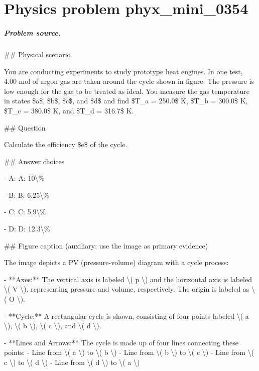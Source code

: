 
\chapter{Physics problem phyx\_mini\_0354}
\label{ch:PhyXMiniProblems_problem_phyx_mini_0354}

\paragraph{Problem source.}
\#\# Physical scenario

You are conducting experiments to study prototype heat engines. In one test, 4.00 mol of argon gas are taken around the cycle shown in figure. The pressure is low enough for the gas to be treated as ideal. You measure the gas temperature in states \$a\$, \$b\$, \$c\$, and \$d\$ and find \$T\_a = 250.0\$ K, \$T\_b = 300.0\$ K, \$T\_c = 380.0\$ K, and \$T\_d = 316.7\$ K.

\#\# Question

Calculate the efficiency \$e\$ of the cycle.

\#\# Answer choices

- A: A: 10\textbackslash{}\%

- B: B: 6.25\textbackslash{}\%

- C: C: 5.9\textbackslash{}\%

- D: D: 12.3\textbackslash{}\%

\#\# Figure caption (auxiliary; use the image as primary evidence)

The image depicts a PV (pressure-volume) diagram with a cycle process:

- **Axes:** The vertical axis is labeled \textbackslash{}( p \textbackslash{}) and the horizontal axis is labeled \textbackslash{}( V \textbackslash{}), representing pressure and volume, respectively. The origin is labeled as \textbackslash{}( O \textbackslash{}).

- **Cycle:** A rectangular cycle is shown, consisting of four points labeled \textbackslash{}( a \textbackslash{}), \textbackslash{}( b \textbackslash{}), \textbackslash{}( c \textbackslash{}), and \textbackslash{}( d \textbackslash{}).

- **Lines and Arrows:** The cycle is made up of four lines connecting these points:
  - Line from \textbackslash{}( a \textbackslash{}) to \textbackslash{}( b \textbackslash{})
  - Line from \textbackslash{}( b \textbackslash{}) to \textbackslash{}( c \textbackslash{})
  - Line from \textbackslash{}( c \textbackslash{}) to \textbackslash{}( d \textbackslash{})
  - Line from \textbackslash{}( d \textbackslash{}) to \textbackslash{}( a \textbackslash{})

